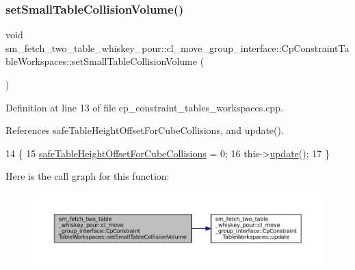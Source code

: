 \subsubsection{\texorpdfstring{set\+Small\+Table\+Collision\+Volume()}{setSmallTableCollisionVolume()}}
{\footnotesize\ttfamily void sm\+\_\+fetch\+\_\+two\+\_\+table\+\_\+whiskey\+\_\+pour\+::cl\+\_\+move\+\_\+group\+\_\+interface\+::\+Cp\+Constraint\+Table\+Workspaces\+::set\+Small\+Table\+Collision\+Volume (\begin{DoxyParamCaption}{ }\end{DoxyParamCaption})}



Definition at line 13 of file cp\+\_\+constraint\+\_\+tables\+\_\+workspaces.\+cpp.



References safe\+Table\+Height\+Offset\+For\+Cube\+Collisions, and update().


\begin{DoxyCode}
14         \{
15             \hyperlink{classsm__fetch__two__table__whiskey__pour_1_1cl__move__group__interface_1_1CpConstraintTableWorkspaces_a16a18c331ca1476ec1fb021dc0c0be97}{safeTableHeightOffsetForCubeCollisions} = 0;
16             this->\hyperlink{classsm__fetch__two__table__whiskey__pour_1_1cl__move__group__interface_1_1CpConstraintTableWorkspaces_a7c8e7186aff561f2a1721145814add82}{update}();
17         \}
\end{DoxyCode}
Here is the call graph for this function\+:
\nopagebreak
\begin{figure}[H]
\begin{center}
\leavevmode
\includegraphics[width=350pt]{classsm__fetch__two__table__whiskey__pour_1_1cl__move__group__interface_1_1CpConstraintTableWorkspaces_aec8ff8ff7f564986dc02cc019c67a233_cgraph}
\end{center}
\end{figure}
\mbox{\label{classsm__fetch__two__table__whiskey__pour_1_1cl__move__group__interface_1_1CpConstraintTableWorkspaces_a7c8e7186aff561f2a1721145814add82}} 

